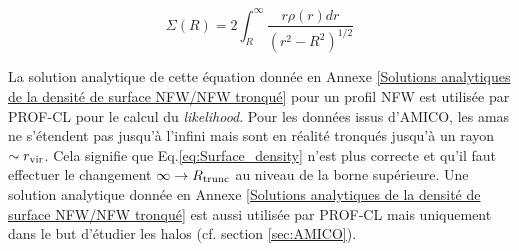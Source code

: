 \documentclass[a4paper,11pt]{article}
\numberwithin{equation}{section}
\begin{document}
    \begin{equation}
      \label{eq:Surface_density}
      \Sigma(R) = 2 \int _{R}^{\infty} \frac{r \rho (r) dr}{(r^2 - R^2)^{1/2}} 
    \end{equation}
    
    La solution analytique de cette équation donnée en Annexe \ref{Solutions analytiques de la densité de surface NFW/NFW tronqué} pour un profil NFW est utilisée par PROF-CL pour le calcul du \textit{likelihood}.
	Pour les données issus d'AMICO, les amas ne s'étendent pas jusqu'à l'infini mais sont en réalité tronqués jusqu'à un rayon $\sim r_{\rm{vir}}$. Cela signifie que Eq.\ref{eq:Surface_density} n'est plus correcte et qu'il faut effectuer le changement $\infty \rightarrow R_{\rm{trunc}}$ au niveau de la borne supérieure. Une solution analytique donnée en Annexe \ref{Solutions analytiques de la densité de surface NFW/NFW tronqué} est aussi utilisée par PROF-CL mais uniquement dans le but d'étudier les halos (cf. section \ref{sec:AMICO}).
	
	
	
\end{document}
